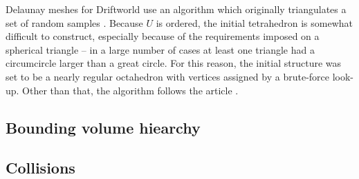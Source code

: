 Delaunay meshes for Driftworld use an algorithm which originally triangulates a set of random samples \cite{ma}. Because $U$ is ordered, the initial tetrahedron is somewhat difficult to construct, especially because of the requirements imposed on a spherical triangle -- in a large number of cases at least one triangle had a circumcircle larger than a great circle. For this reason, the initial structure was set to be a nearly regular octahedron with vertices assigned by a brute-force look-up. Other than that, the algorithm follows the article \cite{ma}.
\subsection{Bounding volume hiearchy}
\subsection{Collisions}


